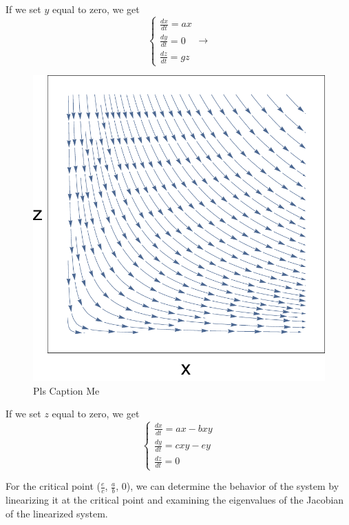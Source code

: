 \documentclass[11pt,oneside]{article}
\begin{document}
	If we set $y$ equal to zero, we get
	\begin{equation}
	\begin{cases}
	\frac{dx}{dt} = ax\\
	\frac{dy}{dt} = 0\\
	\frac{dz}{dt} = gz
	\end{cases}
	\rightarrow
	\end{equation}
	\begin{figure}[H]
		\center
		\includegraphics[scale=0.5]{XZ}
		\caption{Pls Caption Me}
	\end{figure}
	
	If we set $z$ equal to zero, we get
	\begin{equation}
	\begin{cases}
	\frac{dx}{dt} = ax - bxy\\
	\frac{dy}{dt} = cxy - ey\\
	\frac{dz}{dt} = 0
	\end{cases}
	\end{equation}
	
	For the critical point ($\frac{e}{c}$, $\frac{a}{b}$, $0$), we can determine the behavior of the system by linearizing it at the critical point and examining the eigenvalues of the Jacobian of the linearized system.
	
\end{document}
